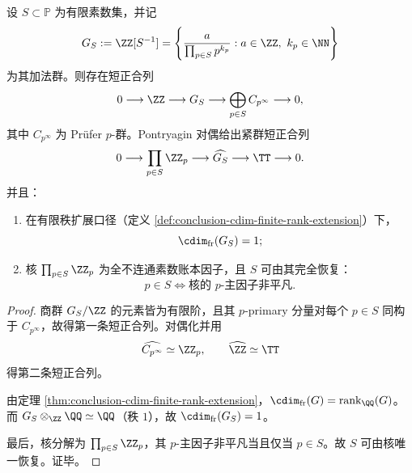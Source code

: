 \begin{theorem}\label{thm:killo-localization-circle-dimension-prime-ledger-splitting}
设 \(S\subset\mathbb P\) 为有限素数集，并记
\[
G_S:=\ZZ[S^{-1}]
=\left\{\frac{a}{\prod_{p\in S}p^{k_p}}:a\in\ZZ,\ k_p\in\NN\right\}
\]
为其加法群。则存在短正合列
\[
0\longrightarrow \ZZ\longrightarrow G_S\longrightarrow \bigoplus_{p\in S}C_{p^\infty}\longrightarrow 0,
\]
其中 \(C_{p^\infty}\) 为 Prüfer \(p\)-群。Pontryagin 对偶给出紧群短正合列
\[
0\longrightarrow \prod_{p\in S}\ZZ_p\longrightarrow \widehat{G_S}\longrightarrow \TT\longrightarrow 0.
\]
并且：
\begin{enumerate}
  \item 在有限秩扩展口径（定义 \ref{def:conclusion-cdim-finite-rank-extension}）下，
  \[
  \cdim_{\mathrm{fr}}(G_S)=1;
  \]
  \item 核 \(\prod_{p\in S}\ZZ_p\) 为全不连通素数账本因子，且 \(S\) 可由其完全恢复：
  \[
  p\in S\iff \text{核的 \(p\)-主因子非平凡}.
  \]
\end{enumerate}
\end{theorem}
\begin{proof}
商群 \(G_S/\ZZ\) 的元素皆为有限阶，且其 \(p\)-primary 分量对每个 \(p\in S\) 同构于 \(C_{p^\infty}\)，故得第一条短正合列。对偶化并用
\[
\widehat{C_{p^\infty}}\simeq \ZZ_p,\qquad \widehat{\ZZ}\simeq \TT
\]
得第二条短正合列。

由定理 \ref{thm:conclusion-cdim-finite-rank-extension}，\(\cdim_{\mathrm{fr}}(G)=\operatorname{rank}_{\QQ}(G)\)。而 \(G_S\otimes_{\ZZ}\QQ\simeq \QQ\)（秩 \(1\)），故 \(\cdim_{\mathrm{fr}}(G_S)=1\)。

最后，核分解为 \(\prod_{p\in S}\ZZ_p\)，其 \(p\)-主因子非平凡当且仅当 \(p\in S\)。故 \(S\) 可由核唯一恢复。证毕。
\end{proof}

